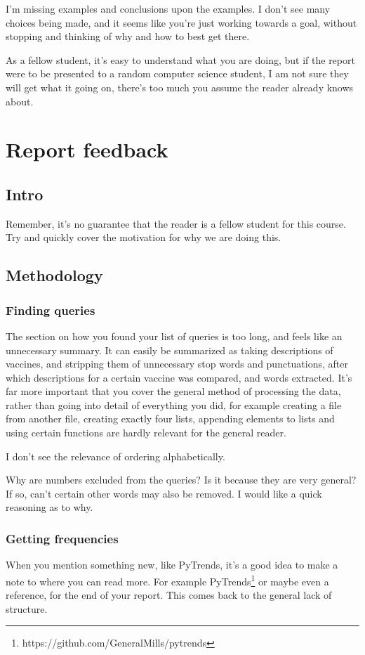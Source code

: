 \documentclass[11pt]{article} %
\begin{document}
I'm missing examples and conclusions upon the examples. I don't see many choices being made, and it seems like you're just working towards a goal, without stopping and thinking of why and how to best get there.

As a fellow student, it's easy to understand what you are doing, but if the report were to be presented to a random computer science student, I am not sure they will get what it going on, there's too much you assume the reader already knows about.
\section*{Report feedback}
\subsection*{Intro}
Remember, it's no guarantee that the reader is a fellow student for this course. Try and quickly cover the motivation for why we are doing this.

\subsection*{Methodology}
\subsubsection*{Finding queries}
The section on how you found your list of queries is too long, and feels like an unnecessary summary. It can easily be summarized as taking descriptions of vaccines, and stripping them of unnecessary stop words and punctuations, after which descriptions for a certain vaccine was compared, and words extracted.
It's far more important that you cover the general method of processing the data, rather than going into detail of everything you did, for example creating a file from another file, creating exactly four lists, appending elements to lists and using certain functions are hardly relevant for the general reader.

I don't see the relevance of ordering alphabetically.

Why are numbers excluded from the queries? Is it because they are very general? If so, can't certain other words may also be removed. I would like a quick reasoning as to why.

\subsubsection*{Getting frequencies}
When you mention something new, like PyTrends, it's a good idea to make a note to where you can read more. For example PyTrends\footnote{https://github.com/GeneralMills/pytrends} or maybe even a reference\cite{pytrends}, for the end of your report. This comes back to the general lack of structure.
\end{document}
